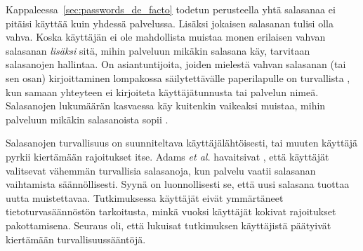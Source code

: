 \documentclass{tktltiki}
\begin{document}
Kappaleessa~\ref{sec:passwords_de_facto} todetun perusteella yhtä salasanaa ei pitäisi käyttää kuin yhdessä palvelussa. Lisäksi jokaisen salasanan tulisi olla vahva. Koska käyttäjän ei ole mahdollista muistaa monen erilaisen vahvan salasanan \emph{lisäksi} sitä, mihin palveluun mikäkin salasana käy, tarvitaan salasanojen hallintaa. On asiantuntijoita, joiden mielestä vahvan salasanan (tai sen osan) kirjoittaminen lompakossa säilytettävälle paperilapulle on turvallista \cite{fsecure_passwords_on_postit_09, microsoft_guru_write_your_password_05, schneier_changing_passwords_10, schneier_choosing_passwords_07, schneier_write_down_your_password_05}, kun samaan yhteyteen ei kirjoiteta käyttäjätunnusta tai palvelun nimeä. Salasanojen lukumäärän kasvaessa käy kuitenkin vaikeaksi muistaa, mihin palveluun mikäkin salasanoista sopii \cite{study_of_passwords_07}. 

Salasanojen turvallisuus on suunniteltava käyttäjälähtöisesti, tai muuten käyttäjä pyrkii kiertämään rajoitukset itse. Adams \emph{et al.} havaitsivat \cite{users_are_not_the_enemy_99}, että käyttäjät valitsevat vähemmän turvallisia salasanoja, kun palvelu vaatii salasanan vaihtamista säännöllisesti. Syynä on luonnollisesti se, että uusi salasana tuottaa uutta muistettavaa. Tutkimuksessa käyttäjät eivät ymmärtäneet tietoturvasäännöstön tarkoitusta, minkä vuoksi käyttäjät kokivat rajoitukset pakottamisena. Seuraus oli, että lukuisat tutkimuksen käyttäjistä päätyivät kiertämään turvallisuussääntöjä.

% 
% 
%
%
\end{document}
